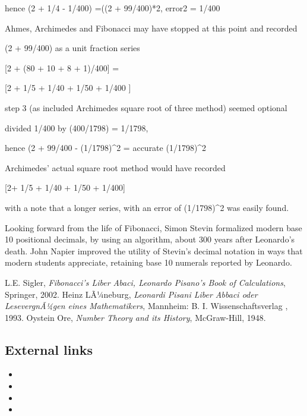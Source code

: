 \documentclass[12pt]{article}
\begin{document}
hence (2 + 1/4 - 1/400) =((2 + 99/400)*2, error2 = 1/400

Ahmes, Archimedes and Fibonacci may have stopped at this point and recorded

(2 + 99/400) as a unit fraction series

[2 + (80 + 10 + 8 + 1)/400] =

[2 + 1/5 + 1/40 + 1/50 + 1/400 ]

step 3 (as included Archimedes square root of three method) seemed optional

divided 1/400 by (400/1798) = 1/1798,

hence (2 + 99/400 - (1/1798)^2 = accurate (1/1798)^2

Archimedes’ actual square root method would have recorded

[2+ 1/5 + 1/40 + 1/50 + 1/400]

with a note that a longer series, with an error of (1/1798)^2 was easily found.

Looking forward from the life of Fibonacci, Simon Stevin formalized modern base 10 positional decimals, by using an algorithm, about 300 years after Leonardo's death. John Napier improved the utility of Stevin's decimal notation in ways that modern students appreciate, retaining base 10 numerals reported by Leonardo.


\begin{thebibliography}{3}
L.E. Sigler, \emph{Fibonacci's Liber Abaci, Leonardo Pisano's Book of Calculations}, Springer, 2002.
 Heinz LÃ¼neburg, \emph{Leonardi Pisani Liber Abbaci oder LesevergnÃ¼gen eines Mathematikers}, Mannheim: B. I. Wissenschaftsverlag , 1993.
 Oystein Ore, \emph{Number Theory and its History}, McGraw-Hill, 1948.
\end{thebibliography}

\subsection{External links}
\begin{itemize}
\item {}
\item {}
\item {}
\item {}
\end{itemize}

\end{document}
